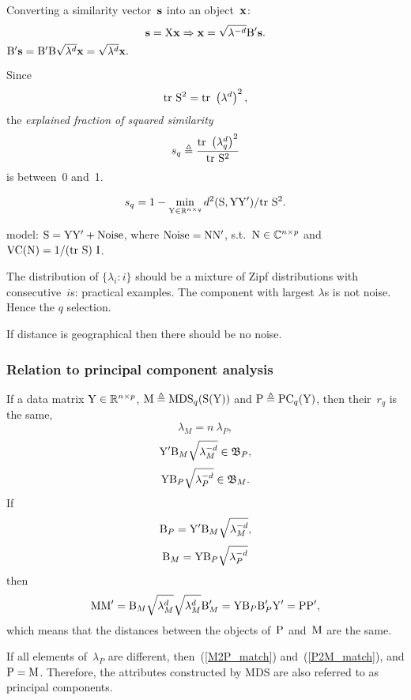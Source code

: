 \documentclass[10pt,a4paper]{article}
\theoremstyle{plain} \newtheorem{Lem}{Lemma}
\begin{document}
Converting a similarity vector~$\mathbf s$ into an object~$\mathbf x$:
$$ \mathbf s = \mathrm X \mathbf x \Rightarrow \mathbf x = \sqrt{\mathbf \lambda^{-d}} \mathrm B' \mathbf s. $$
\proof 
{
$\mathrm B' \mathbf s = \mathrm B' \mathrm B \sqrt{\mathbf \lambda^d} \mathbf x = \sqrt{\mathbf \lambda^d} \mathbf x.$
}


Since
$$ \mathrm {tr} \  \mathrm S^2 = \mathrm {tr} \  \left(\mathbf \lambda^d \right)^2, $$
the {\em explained fraction of squared similarity}
$$ s_q \triangleq \frac {\mathrm {tr} \  \left(\mathbf \lambda^d_q \right)^2} {\mathrm {tr} \  \mathrm S^2} $$
is between~0 and~1.

$$ s_q = 1 - \min_{\mathrm Y \in \mathbb R^{n \times q}} d^2(\mathrm S, \mathrm Y \mathrm Y') / \mathrm {tr} \  \mathrm S^2. $$

\comm
{model: $\mathrm S = \mathrm Y \mathrm Y' + \mathrm {Noise}$, where $\mathrm{Noise} = \mathrm N \mathrm N'$, s.t.~$\mathrm N \in \mathbb C^{n \times p}$ and $\mathrm {VC}(\mathrm N) = 1 / (\mathrm {tr} \  \mathrm S) \ \mathrm I$.
    
The distribution of $\{\lambda_i : i\}$ should be a mixture of Zipf distributions with consecutive~$i$s: practical examples.
The component with largest $\lambda$s is not noise.
Hence the $q$ selection.

If distance is geographical then there should be no noise.
}


\subsubsection{Relation to principal component analysis}

If a data matrix $\mathrm Y \in \mathbb R^{n \times p}$, $\mathrm M \triangleq \mathrm {MDS}_q(\mathrm S(\mathrm Y))$ and $\mathrm P \triangleq \mathrm {PC}_q(\mathrm Y)$,
then their~$r_q$ is the same,
$$ \lambda_M = n \ \lambda_P, $$
$$ \mathrm Y' \mathrm B_M \sqrt{\lambda_M^{-d}} \in \mathfrak B_P, $$
$$ \mathrm Y  \mathrm B_P \sqrt{\lambda_P^{-d}} \in \mathfrak B_M. $$
If 
\begin{equation} \label{M2P_match}
  \mathrm B_P = \mathrm Y' \mathrm B_M \sqrt{\lambda_M^{-d}}, 
\end{equation}
\begin{equation} \label{P2M_match}
  \mathrm B_M = \mathrm Y  \mathrm B_P \sqrt{\lambda_P^{-d}} 
\end{equation}
then
$$ \mathrm M \mathrm M' = \mathrm B_M \sqrt {\lambda_M^d} \sqrt {\lambda_M^d} \mathrm B_M'  = \mathrm Y \mathrm B_P \mathrm B_P' \mathrm Y' = \mathrm P \mathrm P', $$
which means that the distances between the objects of~$\mathrm P$ and~$\mathrm M$ are the same.

If all elements of~$\lambda_P$ are different, then~(\ref{M2P_match}) and~({\ref{P2M_match}}), and $\mathrm P = \mathrm M$.
Therefore, the attributes constructed by MDS are also referred to as principal components.
\end{document}
